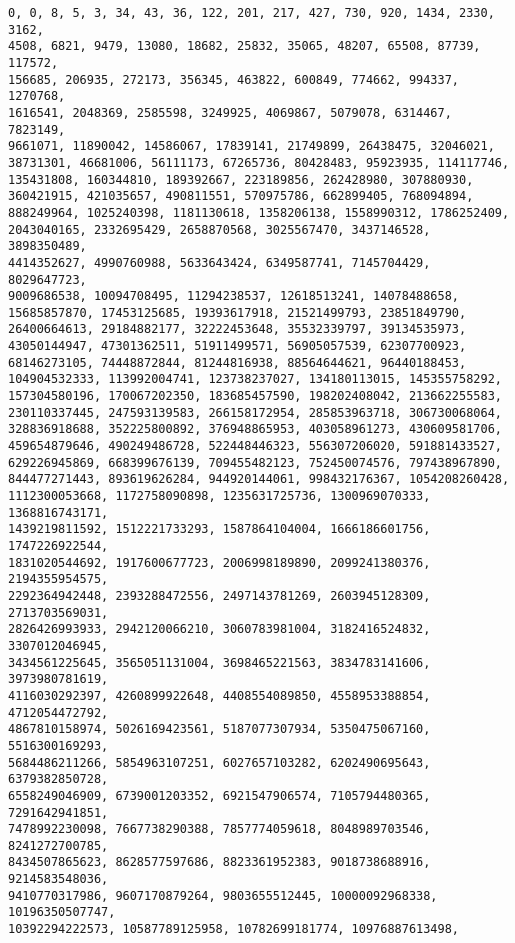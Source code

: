\documentclass[12pt]{article}
\begin{document}
\begin{verbatim}
0, 0, 8, 5, 3, 34, 43, 36, 122, 201, 217, 427, 730, 920, 1434, 2330, 3162, 
4508, 6821, 9479, 13080, 18682, 25832, 35065, 48207, 65508, 87739, 117572,
156685, 206935, 272173, 356345, 463822, 600849, 774662, 994337, 1270768,
1616541, 2048369, 2585598, 3249925, 4069867, 5079078, 6314467, 7823149,
9661071, 11890042, 14586067, 17839141, 21749899, 26438475, 32046021,
38731301, 46681006, 56111173, 67265736, 80428483, 95923935, 114117746,
135431808, 160344810, 189392667, 223189856, 262428980, 307880930,
360421915, 421035657, 490811551, 570975786, 662899405, 768094894,
888249964, 1025240398, 1181130618, 1358206138, 1558990312, 1786252409,
2043040165, 2332695429, 2658870568, 3025567470, 3437146528, 3898350489,
4414352627, 4990760988, 5633643424, 6349587741, 7145704429, 8029647723,
9009686538, 10094708495, 11294238537, 12618513241, 14078488658,
15685857870, 17453125685, 19393617918, 21521499793, 23851849790,
26400664613, 29184882177, 32222453648, 35532339797, 39134535973,
43050144947, 47301362511, 51911499571, 56905057539, 62307700923,
68146273105, 74448872844, 81244816938, 88564644621, 96440188453,
104904532333, 113992004741, 123738237027, 134180113015, 145355758292,
157304580196, 170067202350, 183685457590, 198202408042, 213662255583,
230110337445, 247593139583, 266158172954, 285853963718, 306730068064,
328836918688, 352225800892, 376948865953, 403058961273, 430609581706,
459654879646, 490249486728, 522448446323, 556307206020, 591881433527,
629226945869, 668399676139, 709455482123, 752450074576, 797438967890,
844477271443, 893619626284, 944920144061, 998432176367, 1054208260428,
1112300053668, 1172758090898, 1235631725736, 1300969070333, 1368816743171,
1439219811592, 1512221733293, 1587864104004, 1666186601756, 1747226922544,
1831020544692, 1917600677723, 2006998189890, 2099241380376, 2194355954575,
2292364942448, 2393288472556, 2497143781269, 2603945128309, 2713703569031,
2826426993933, 2942120066210, 3060783981004, 3182416524832, 3307012046945,
3434561225645, 3565051131004, 3698465221563, 3834783141606, 3973980781619,
4116030292397, 4260899922648, 4408554089850, 4558953388854, 4712054472792,
4867810158974, 5026169423561, 5187077307934, 5350475067160, 5516300169293,
5684486211266, 5854963107251, 6027657103282, 6202490695643, 6379382850728,
6558249046909, 6739001203352, 6921547906574, 7105794480365, 7291642941851,
7478992230098, 7667738290388, 7857774059618, 8048989703546, 8241272700785,
8434507865623, 8628577597686, 8823361952383, 9018738688916, 9214583548036,
9410770317986, 9607170879264, 9803655512445, 10000092968338, 10196350507747,
10392294222573, 10587789125958, 10782699181774, 10976887613498,

\end{verbatim}
\end{document}
